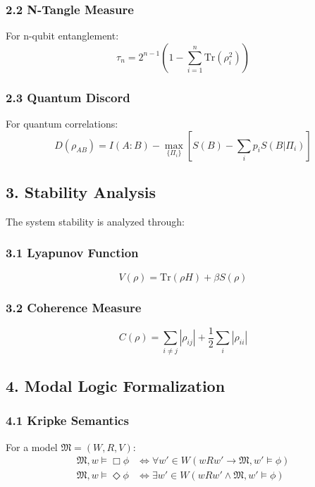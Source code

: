 \subsubsection*{2.2 N-Tangle Measure}
For n-qubit entanglement:
\begin{equation}
    \tau_n = 2^{n-1}\left(1 - \sum_{i=1}^n \text{Tr}(\rho_i^2)\right)
\end{equation}

\subsubsection*{2.3 Quantum Discord}
For quantum correlations:
\begin{equation}
    D(\rho_{AB}) = I(A:B) - \max_{\{\Pi_i\}}\left[S(B) - \sum_i p_i S(B|\Pi_i)\right]
\end{equation}

\subsection*{3. Stability Analysis}

The system stability is analyzed through:

\subsubsection*{3.1 Lyapunov Function}
\begin{equation}
    V(\rho) = \text{Tr}(\rho H) + \beta S(\rho)
\end{equation}

\subsubsection*{3.2 Coherence Measure}
\begin{equation}
    C(\rho) = \sum_{i\neq j} |\rho_{ij}| + \frac{1}{2}\sum_i |\rho_{ii}|
\end{equation}

\subsection*{4. Modal Logic Formalization}

\subsubsection*{4.1 Kripke Semantics}
For a model $\mathfrak{M} = (W, R, V)$:
\begin{align}
    \mathfrak{M}, w \vDash \Box\phi &\iff \forall w' \in W(wRw' \rightarrow \mathfrak{M}, w' \vDash \phi) \\
    \mathfrak{M}, w \vDash \Diamond\phi &\iff \exists w' \in W(wRw' \wedge \mathfrak{M}, w' \vDash \phi)
\end{align}

